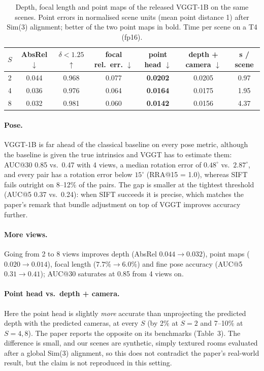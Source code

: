 \documentclass[11pt,a4paper]{article}
\begin{document}
\begin{table}[htbp]
\centering
\caption{Depth, focal length and point maps of the released VGGT-1B on the same scenes. Point errors in normalised scene
units (mean point distance 1) after Sim(3) alignment; better of the two point maps in bold. Time per scene on a T4 (fp16).}
\label{tab:gtdense}
\begin{tabular}{ccccccc}
\toprule
$S$ & AbsRel $\downarrow$ & $\delta<1.25$ $\uparrow$ & focal rel.\ err. $\downarrow$ & point head $\downarrow$ & depth + camera $\downarrow$ & s / scene \\
\midrule
2 & 0.044 & 0.968 & 0.077 & \textbf{0.0202} & 0.0205 & 0.97 \\
4 & 0.036 & 0.976 & 0.064 & \textbf{0.0164} & 0.0175 & 1.95 \\
8 & 0.032 & 0.981 & 0.060 & \textbf{0.0142} & 0.0156 & 4.37 \\
\bottomrule
\end{tabular}
\end{table}

\paragraph{Pose.} VGGT-1B is far ahead of the classical baseline on every pose metric, although the baseline is given the
true intrinsics and VGGT has to estimate them: AUC@30 0.85 vs.\ 0.47 with 4 views, a median rotation error of $0.48^\circ$
vs.\ $2.87^\circ$, and every pair has a rotation error below $15^\circ$ (RRA@15 = 1.0), whereas SIFT fails outright on 8--12\%
of the pairs. The gap is smaller at the tightest threshold (AUC@5 0.37 vs.\ 0.24): when SIFT succeeds it is precise, which
matches the paper's remark that bundle adjustment on top of VGGT improves accuracy further.

\paragraph{More views.} Going from 2 to 8 views improves depth (AbsRel $0.044\to0.032$), point maps ($0.020\to0.014$), focal
length ($7.7\%\to6.0\%$) and fine pose accuracy (AUC@5 $0.31\to0.41$); AUC@30 saturates at 0.85 from 4 views on.

\paragraph{Point head vs.\ depth + camera.} Here the point head is slightly \emph{more} accurate than unprojecting the predicted
depth with the predicted cameras, at every $S$ (by 2\% at $S=2$ and 7--10\% at $S=4,8$). The paper reports the opposite on its
benchmarks (Table~3). The difference is small, and our scenes are synthetic, simply textured rooms evaluated after a global
Sim(3) alignment, so this does not contradict the paper's real-world result, but the claim is not reproduced in this setting.
\end{document}

